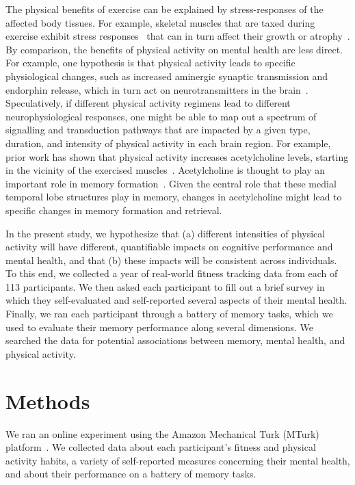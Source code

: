 \documentclass[10pt]{article}
\begin{document}
The physical benefits of exercise can be explained by stress-responses
of the affected body tissues. For example, skeletal muscles that are
taxed during exercise exhibit stress responses~\citep{MortEtal09} that
can in turn affect their growth or atrophy~\citep{SchiEtal13}.  By
comparison, the benefits of physical activity on mental health are less direct.
For example, one hypothesis is that physical activity leads to specific
physiological changes, such as increased aminergic synaptic
transmission and endorphin release, which in turn act on
neurotransmitters in the brain~\citep{PaluSchw00}.  Speculatively, if
different physical activity regimens lead to different neurophysiological
responses, one might be able to map out a spectrum of signalling and
transduction pathways that are impacted by a given type, duration, and
intensity of physical activity in each brain region.  For example, prior work
has shown that physical activity increases acetylcholine levels, starting in
the vicinity of the exercised muscles~\citep{ShoeEtal97}.
Acetylcholine is thought to play an important role in memory
formation~\citep[e.g., by modulating specific synaptic inputs from
entorhinal cortex to the hippocampus, albeit in
rodents;][]{PalaEtal21}.  Given the central role that these medial
temporal lobe structures play in memory, changes in acetylcholine
might lead to specific changes in memory formation and retrieval.

In the present study, we hypothesize that (a) different intensities of physical activity will have different, quantifiable impacts on cognitive
performance and mental health, and that (b) these impacts will be
consistent across individuals.  To this end, we collected a year of
real-world fitness tracking data from each of 113 participants.  We
then asked each participant to fill out a brief survey in which they
self-evaluated and self-reported several aspects of their mental
health.  Finally, we ran each participant through a battery of memory
tasks, which we used to evaluate their memory performance along
several dimensions.  We searched the data for potential associations
between memory, mental health, and physical activity.

 \section*{Methods}

    We ran an online experiment using the Amazon Mechanical Turk (MTurk)
    platform~\citep{GureEtal16}.  We collected data about each participant's fitness and
    physical activity habits, a variety of self-reported measures concerning their
    mental health, and about their performance on a battery of memory
    tasks.
\end{document}
